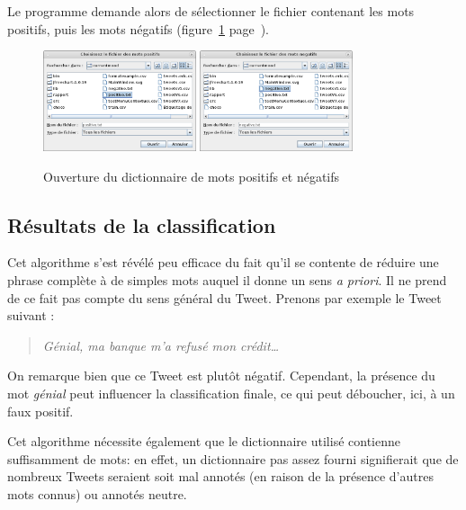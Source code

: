 \documentclass[12pt,a4paper]{report}
\begin{document}
Le programme demande alors de sélectionner le fichier contenant les mots
positifs, puis les mots négatifs (figure~\ref{ouvrir_dictionnaire}
page~\pageref{ouvrir_dictionnaire}).

\begin{figure}[h]
	\centering
	\includegraphics[width=0.4\textwidth]{img/capture_ouvrir-mots-positifs.png}
	\includegraphics[width=0.4\textwidth]{img/capture_ouvrir-mots-negatifs.png}
	\caption{Ouverture du dictionnaire de mots positifs et négatifs}
\label{ouvrir_dictionnaire}
\end{figure}

\newpage
\subsection{Résultats de la classification}
Cet algorithme s'est révélé peu efficace du fait qu'il se contente de réduire
une phrase complète à de simples mots auquel il donne un sens \textit{a priori}.
Il ne prend de ce fait pas compte du sens général du Tweet. Prenons par exemple
le Tweet suivant :

\begin{quote}
	\textit{Génial, ma banque m'a refusé mon crédit…}
\end{quote}

On remarque bien que ce Tweet est plutôt négatif. Cependant, la présence du mot
\textit{génial} peut influencer la classification finale, ce qui peut déboucher,
ici, à un faux positif.

Cet algorithme nécessite également que le dictionnaire utilisé contienne
suffisamment de mots: en effet, un dictionnaire pas assez fourni signifierait
que de nombreux Tweets seraient soit mal annotés (en raison de la présence
d'autres mots connus) ou annotés neutre.
\end{document}
